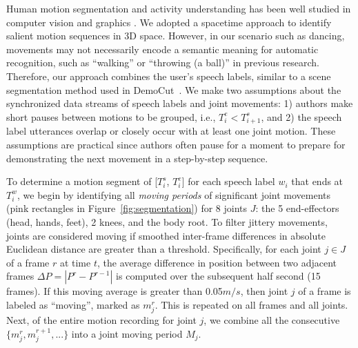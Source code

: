 Human motion segmentation and activity understanding has been well studied in computer vision and graphics \cite{Aggarwal:2011:HAA:1922649.1922653}. We adopted a spacetime approach to identify salient motion sequences in 3D space.
%
However, in our scenario such as dancing, movements may not necessarily encode a semantic meaning for automatic recognition, such as ``walking'' or ``throwing (a ball)'' in previous research. Therefore, our approach combines the user's speech labels, similar to a scene segmentation method used in DemoCut~\cite{Chi:2013:DGC:2501988.2502052}.
%
We make two assumptions about the synchronized data streams of speech labels and joint movements:
1) authors make short pauses between motions to be grouped, i.e., $T_i^e < T_{i+1}^s$, and
2) the speech label utterances overlap or closely occur with at least one joint motion.
%
These assumptions are practical since authors often pause for a moment to prepare for demonstrating the next movement in a step-by-step sequence.



To determine a motion segment of [$T_i^s$, $T_i^e$] for each speech label $w_i$ that ends at $T_i^w$, we begin by identifying all \emph{moving periods} of significant joint movements (pink rectangles in Figure~\ref{fig:segmentation}) for 8 joints $J$: the 5 end-effectors (head, hands, feet), 2 knees, and the body root.
%
To filter jittery movements, joints are considered moving if smoothed inter-frame differences in absolute Euclidean distance are greater than a threshold.
%
Specifically, for each joint $j \in J$ of a frame $r$ at time $t$, the average difference in position between two adjacent frames $\Delta P = |P^r-P^{r-1}|$ is computed over the subsequent half second (15 frames).
%
If this moving average is greater than 0.05$m/s$, then joint $j$ of a frame is labeled as ``moving'', marked as $m_j^r$.
This is repeated on all frames and all joints.
Next, of the entire motion recording for joint $j$, we combine all the consecutive $\{m_j^r, m_j^{r+1}, ...\}$ into a joint moving period $M_j$.

